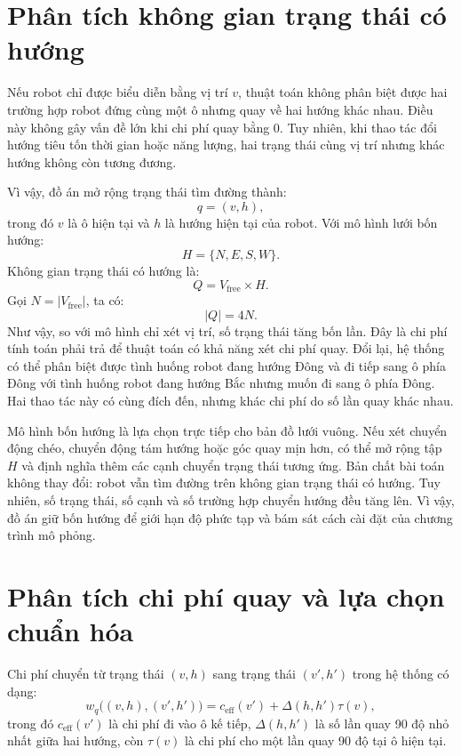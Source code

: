 \documentclass[../DoAn.tex]{subfiles}
\begin{document}
\section{Phân tích không gian trạng thái có hướng}

Nếu robot chỉ được biểu diễn bằng vị trí $v$, thuật toán không phân biệt được hai trường hợp robot đứng cùng một ô nhưng quay về hai hướng khác nhau. Điều này không gây vấn đề lớn khi chi phí quay bằng 0. Tuy nhiên, khi thao tác đổi hướng tiêu tốn thời gian hoặc năng lượng, hai trạng thái cùng vị trí nhưng khác hướng không còn tương đương.

Vì vậy, đồ án mở rộng trạng thái tìm đường thành:
\begin{equation}
q=(v,h),
\end{equation}
trong đó $v$ là ô hiện tại và $h$ là hướng hiện tại của robot. Với mô hình lưới bốn hướng:
\begin{equation}
H=\{N,E,S,W\}.
\end{equation}
Không gian trạng thái có hướng là:
\begin{equation}
Q=V_{\text{free}}\times H.
\end{equation}
Gọi $N=|V_{\text{free}}|$, ta có:
\begin{equation}
|Q|=4N.
\end{equation}
Như vậy, so với mô hình chỉ xét vị trí, số trạng thái tăng bốn lần. Đây là chi phí tính toán phải trả để thuật toán có khả năng xét chi phí quay. Đổi lại, hệ thống có thể phân biệt được tình huống robot đang hướng Đông và đi tiếp sang ô phía Đông với tình huống robot đang hướng Bắc nhưng muốn đi sang ô phía Đông. Hai thao tác này có cùng đích đến, nhưng khác chi phí do số lần quay khác nhau.

Mô hình bốn hướng là lựa chọn trực tiếp cho bản đồ lưới vuông. Nếu xét chuyển động chéo, chuyển động tám hướng hoặc góc quay mịn hơn, có thể mở rộng tập $H$ và định nghĩa thêm các cạnh chuyển trạng thái tương ứng. Bản chất bài toán không thay đổi: robot vẫn tìm đường trên không gian trạng thái có hướng. Tuy nhiên, số trạng thái, số cạnh và số trường hợp chuyển hướng đều tăng lên. Vì vậy, đồ án giữ bốn hướng để giới hạn độ phức tạp và bám sát cách cài đặt của chương trình mô phỏng.

\section{Phân tích chi phí quay và lựa chọn chuẩn hóa}

Chi phí chuyển từ trạng thái $(v,h)$ sang trạng thái $(v',h')$ trong hệ thống có dạng:
\begin{equation}
w_q\bigl((v,h),(v',h')\bigr)=c_{\text{eff}}(v')+\Delta(h,h')\tau(v),
\end{equation}
trong đó $c_{\text{eff}}(v')$ là chi phí đi vào ô kế tiếp, $\Delta(h,h')$ là số lần quay 90 độ nhỏ nhất giữa hai hướng, còn $\tau(v)$ là chi phí cho một lần quay 90 độ tại ô hiện tại.
\end{document}
